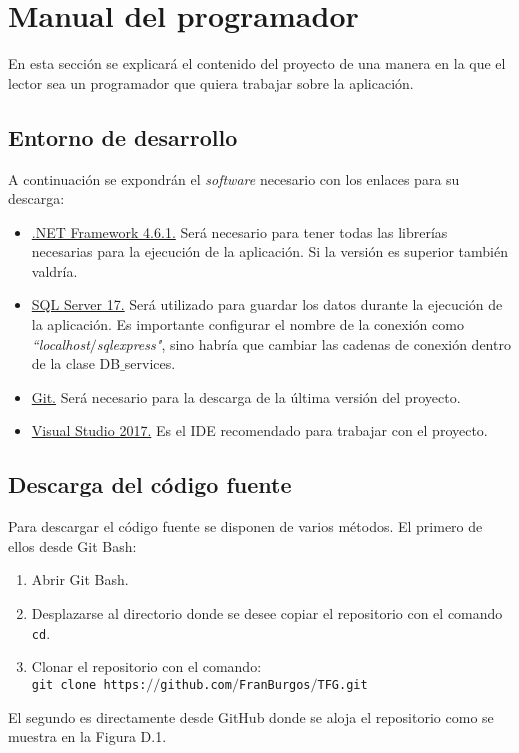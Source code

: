 \section{Manual del programador}

En esta sección se explicará el contenido del proyecto de una manera en la que el lector sea un programador que quiera trabajar sobre la aplicación.

\subsection{Entorno de desarrollo}

A continuación se expondrán el \textit{software} necesario con los enlaces para su descarga:
\begin{itemize}
	\item \href{https://www.microsoft.com/es-es/download/details.aspx?id=49982}{.NET Framework 4.6.1.} Será necesario para tener todas las librerías necesarias para la ejecución de la aplicación. Si la versión es superior también valdría.
	\item \href{https://www.microsoft.com/es-es/sql-server/sql-server-downloads}{SQL Server 17.} Será utilizado para guardar los datos durante la ejecución de la aplicación. Es importante configurar el nombre de la conexión como \textit{``localhost$\slash$sqlexpress"}, sino habría que cambiar las cadenas de conexión dentro de la clase DB$\_$services.
	\item \href{https://git-scm.com/downloads}{Git.} Será necesario para la descarga de la última versión del proyecto.
	\item \href{https://visualstudio.microsoft.com/es/downloads/}{Visual Studio 2017.} Es el IDE recomendado para trabajar con el proyecto.
\end{itemize}

\subsection{Descarga del código fuente}

Para descargar el código fuente se disponen de varios métodos. El primero de ellos desde Git Bash:
\begin{enumerate}
	\item Abrir Git Bash.
	\item Desplazarse al directorio donde se desee copiar el repositorio con el comando \texttt{cd}.
	\item Clonar el repositorio con el comando:\\ \texttt{git clone https:$\slash\slash$github.com$\slash$FranBurgos$\slash$TFG.git}
\end{enumerate}
El segundo es directamente desde GitHub donde se aloja el repositorio como se muestra en la Figura D.1.

